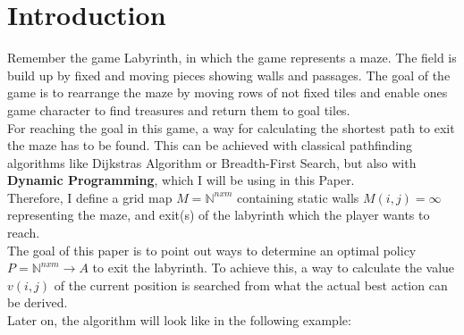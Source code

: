 \documentclass[conference]{IEEEtran}
\begin{document}
\section{Introduction}
Remember the game Labyrinth, in which the game represents a maze. The field is build up by fixed and moving pieces showing walls and passages. The goal of the game is to rearrange the maze by moving rows of not fixed tiles and enable ones game character to find treasures and return them to goal tiles.
\\
For reaching the goal in this game, a way for calculating the shortest path to exit the maze has to be found. This can be achieved with classical pathfinding algorithms like Dijkstras Algorithm or Breadth-First Search, but also with \textbf{Dynamic Programming}, which I will be using in this Paper.
\\
Therefore, I define a grid map $M=\mathbb{N}^{nxm}$ containing static walls $M(i,j)=\infty$ representing the maze, and exit(s) of the labyrinth which the player wants to reach.
\\
The goal of this paper is to point out ways to determine an optimal policy $P=\mathbb{N}^{nxm}\rightarrow A$ to exit the labyrinth. To achieve this, a way to calculate the value $v(i,j)$ of the current position is searched from what the actual best action can be derived.\\
Later on, the algorithm will look like in the following example:
\end{document}
